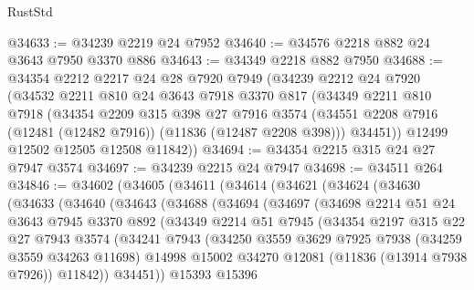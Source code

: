 \begin{lexlean}{RustStd}
\begin{coremodule}
@34633 := @34239 @2219 @24 @7952
@34640 := @34576 @2218 @882 @24 @3643 @7950 @3370 @886
@34643 := @34349 @2218 @882 @7950
@34688 := @34354
    @2212
    @2217
    @24
    @28
    @7920
    @7949
    (@34239
      @2212
      @24
      @7920
      (@34532
        @2211
        @810
        @24
        @3643
        @7918
        @3370
        @817
        (@34349
          @2211
          @810
          @7918
          (@34354
            @2209
            @315
            @398
            @27
            @7916
            @3574
            (@34551 @2208 @7916 (@12481 (@12482 @7916)) (@11836 (@12487 @2208 @398)))
            @34451))
        @12499
        @12502
        @12505
        @12508
        @11842))
@34694 := @34354 @2215 @315 @24 @27 @7947 @3574
@34697 := @34239 @2215 @24 @7947
@34698 := @34511 @264
@34846 := @34602
    (@34605
      (@34611
        (@34614
          (@34621
            (@34624
              (@34630
                (@34633
                  (@34640
                    (@34643
                      (@34688
                        (@34694
                          (@34697
                            (@34698
                              @2214
                              @51
                              @24
                              @3643
                              @7945
                              @3370
                              @892
                              (@34349
                                @2214
                                @51
                                @7945
                                (@34354
                                  @2197
                                  @315
                                  @22
                                  @27
                                  @7943
                                  @3574
                                  (@34241
                                    @7943
                                    (@34250
                                      @3559
                                      @3629
                                      @7925
                                      @7938
                                      (@34259 @3559 @34263 @11698)
                                      @14998
                                      @15002
                                      @34270
                                      @12081
                                      (@11836 (@13914 @7938 @7926))
                                      @11842))
                                  @34451))
                              @15393
                              @15396

\end{coremodule}
\end{lexlean}
